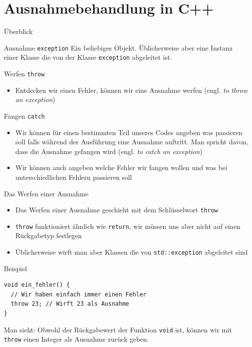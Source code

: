 \documentclass[presentation]{beamer}
\begin{document}
\section{Ausnahmebehandlung in C++}
\label{sec:orgc628c23}
\begin{frame}[label={sec:org9f90b25},fragile]{Überblick}
 \begin{block}{Ausnahme {\color{solarizedYellow}\texttt{exception}}}
Ein beliebiges Objekt. Üblicherweise aber eine \alert{Instanz einer Klasse}
die von der Klasse {\color{solarizedYellow}\texttt{exception} }abgeleitet ist.
\end{block}
\begin{block}{Werfen {\color{solarizedYellow}\texttt{throw}}}
\begin{itemize}
\item Entdecken wir einen Fehler, können wir eine \alert{Ausnahme werfen} (engl.
\emph{to throw an exception})
\end{itemize}
\end{block}
\begin{block}{Fangen {\color{solarizedYellow}\texttt{catch}}}
\begin{itemize}
\item Wir können für einen bestimmten Teil unseres Codes angeben was
passieren soll falls während der Ausführung eine Ausnahme auftritt.
Man spricht davon, dass die \alert{Ausnahme gefangen} wird (engl. \emph{to
catch an exception})
\item Wir können auch angeben \alert{welche Fehler} wir fangen wollen und was bei
unterschiedlichen Fehlern passieren soll
\end{itemize}
\end{block}
\end{frame}
\begin{frame}[label={sec:org5298115},fragile]{Das Werfen einer Ausnahme}
 \begin{itemize}
\item Das Werfen einer Ausnahme geschieht mit dem Schlüsselwort {\color{solarizedYellow}\texttt{throw}}
\item {\color{solarizedYellow}\texttt{throw} }funktioniert ähnlich wie {\color{solarizedYellow}\texttt{return}}, wir müssen uns aber nicht
auf einen Rückgabetyp festlegen
\item Üblicherweise wirft man aber Klassen die von {\color{solarizedYellow}\texttt{std::exception}}
abgeleitet sind
\end{itemize}
\begin{block}{Beispiel}
\begin{verbatim}
void ein_fehler() {
  // Wir haben einfach immer einen Fehler
  throw 23; // Wirft 23 als Ausnahme
}
\end{verbatim}
Man sieht: Obwohl der Rückgabewert der Funktion {\color{solarizedYellow}\texttt{void} }ist, können wir
mit {\color{solarizedYellow}\texttt{throw} }einen Integer als Ausnahme zurück geben.
\end{block}
\end{frame}
\end{document}
